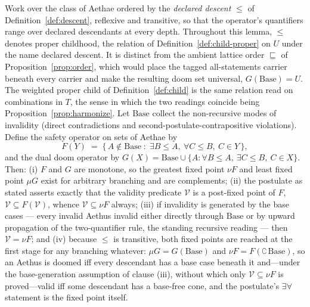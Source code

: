 \begin{lemma}\label{lem:fp}
Work over the class of Aethae ordered by the \emph{declared descent} $\le$ of Definition~\ref{def:descent}, reflexive and transitive, so that the operator's quantifiers range over declared descendants at every depth. Throughout this lemma, $\le$ denotes proper childhood, the relation of Definition~\ref{def:child-proper} on $U$ under the name declared descent. It is distinct from the ambient lattice order $\sqsubseteq$ of Proposition~\ref{prop:order}, which would place the tagged all-statements carrier beneath every carrier and make the resulting doom set universal, $G(\mathrm{Base}) = U$. The weighted proper child of Definition~\ref{def:child} is the same relation read on combinations in $T$, the sense in which the two readings coincide being Proposition~\ref{prop:harmonize}. Let $\mathrm{Base}$ collect the non-recursive modes of invalidity (direct contradictions and second-postulate-contrapositive violations). Define the safety operator on sets of Aethae by
\[
F(Y) \;=\; \{\, A \notin \mathrm{Base} \;:\; \exists B \le A,\ \forall C \le B,\ C \in Y \,\},
\]
and the dual doom operator by $G(X) = \mathrm{Base} \cup \{A : \forall B \le A,\ \exists C \le B,\ C \in X\}$. Then: (i) $F$ and $G$ are monotone, so the greatest fixed point $\nu F$ and least fixed point $\mu G$ exist for arbitrary branching and are complements; (ii) the postulate as stated asserts exactly that the validity predicate $\mathcal{V}$ is a post-fixed point of $F$, $\mathcal{V} \subseteq F(\mathcal{V})$, whence $\mathcal{V} \subseteq \nu F$ always; (iii) if invalidity is generated by the base cases --- every invalid Aethus invalid either directly through $\mathrm{Base}$ or by upward propagation of the two-quantifier rule, the standing recursive reading --- then $\mathcal{V} = \nu F$; and (iv) because $\le$ is transitive, both fixed points are reached at the first stage for any branching whatever: $\mu G = G(\mathrm{Base})$ and $\nu F = F(\complement\,\mathrm{Base})$, so an Aethus is doomed iff every descendant has a base case beneath it and---under the base-generation assumption of clause (iii), without which only $\mathcal{V} \subseteq \nu F$ is proved---valid iff some descendant has a base-free cone, and the postulate's $\exists\forall$ statement is the fixed point itself. \end{lemma}

